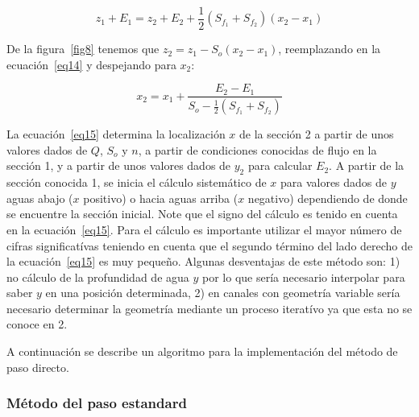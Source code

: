 \documentclass[11pt, oneside]{article}
\begin{document}
\begin{equation}
    z_1 + E_1 = z_2 + E_2  + \frac{1}{2}\left( S_{f_1} + S_{f_2} \right)  (x_2 - x_1)
\label{eq14}
\end{equation}

De la figura~\ref{fig8} tenemos que $z_2 = z_1 - S_o \left( x_2 - x_1 \right)$, reemplazando en la ecuaci\'on~\ref{eq14} y despejando para $x_2$:

\begin{equation}
    x_2 = x_1 + \frac{E_2 - E_1}{S_o - \frac{1}{2}\left( S_{f_1} + S_{f_2} \right)}
\label{eq15}
\end{equation}

La ecuaci\'on~\ref{eq15} determina la localizaci\'on $x$ de la secci\'on 2 a partir de unos valores dados de $Q$, $S_o$ y $n$, a partir de condiciones conocidas de flujo en la secci\'on 1, y a partir de unos valores dados de $y_2$ para calcular $E_2$. A partir de la secci\'on conocida 1, se inicia el c\'alculo sistem\'atico de $x$ para valores dados de $y$ aguas abajo ($x$ positivo) o hacia aguas arriba ($x$ negativo) dependiendo de donde se encuentre la secci\'on inicial. Note que el signo del c\'alculo es tenido en cuenta en la ecuaci\'on~\ref{eq15}. Para el c\'alculo es importante utilizar el mayor n\'umero de cifras significat\'ivas teniendo en cuenta que el segundo t\'ermino del lado derecho de la ecuaci\'on~\ref{eq15} es muy pequeño. Algunas desventajas de este m\'etodo son: 1) no c\'alculo de la profundidad de agua $y$ por lo que ser\'ia necesario interpolar para saber $y$ en una posici\'on  determinada, 2) en canales con geometr\'ia variable ser\'ia necesario determinar la geometr\'ia mediante un proceso iterat\'ivo ya que esta no se conoce en 2. 

A continuaci\'on se describe un algoritmo para la implementaci\'on del m\'etodo de paso directo.





\subsubsection{M\'etodo del paso estandard}

\end{document}

